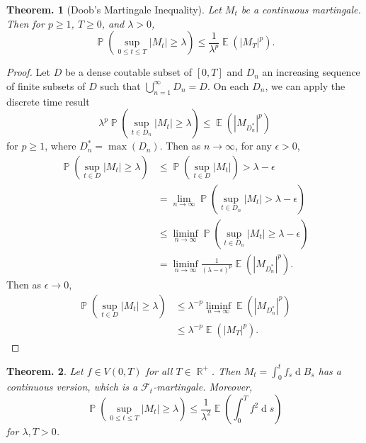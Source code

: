 \documentclass[11pt, a4paper]{memoir}
\DeclareMathOperator{\R}{{\mathbb{R}}}
\theoremstyle{change}
\newtheorem{theorem}{Theorem.}[section]
\theoremstyle{plain}
\theoremstyle{nonumberplain}
\newtheorem{proof}{Proof}
\DeclareMathOperator{\pr}{{\mathbb{P}}}
\DeclareMathOperator{\E}{{\mathbb{E}}}
\renewcommand{\d}[1]{\ensuremath{\operatorname{d}\!{#1}}}
\numberwithin{equation}{section}
\begin{document}
\begin{theorem}[Doob's Martingale Inequality]
    Let $M_t$ be a continuous martingale.
    Then for $p\geq 1$, $T\geq 0$, and $\lambda>0$,
    \begin{equation*}
        \pr(\sup_{0\leq t\leq T}|M_t|\geq\lambda)\leq\frac{1}{\lambda^p}\E(|M_T|^p).
    \end{equation*}
\end{theorem}
\begin{proof}
    Let $D$ be a dense coutable subset of $[0,T]$ and $D_n$ an increasing sequence of finite subsets of $D$ such that $\bigcup_{n=1}^\infty D_n=D$.
    On each $D_n$, we can apply the discrete time result
    \begin{equation*}
        \lambda^p\pr(\sup_{t\in D_n}|M_t|\geq\lambda)\leq\E(|M_{D_n^*}|^p)
    \end{equation*}
    for $p\geq 1$, where $D_n^*=\max(D_n)$.
    Then as $n\to\infty$, for any $\epsilon>0$,
    \begin{align*}
        \pr(\sup_{t\in D}|M_t|\geq\lambda)&\leq\pr(\sup_{t\in D}|M_t|)>\lambda-\epsilon\\
                                          &=\lim_{n\to\infty}\pr(\sup_{t\in D_n}|M_t|>\lambda-\epsilon)\\
                                          &\leq\liminf_{n\to\infty}\pr(\sup_{t\in D_n}|M_t|\geq\lambda-\epsilon)\\
                                          &= \liminf_{n\to\infty}\frac{1}{(\lambda-\epsilon)^p}\E(|M_{D_n^*}|^p).
    \end{align*}
    Then as $\epsilon\to 0$,
    \begin{align*}
        \pr(\sup_{t\in D}|M_t|\geq\lambda) &\leq\lambda^{-p}\liminf_{n\to\infty}\E(|M_{D_n^*}|^p)\\
                                           &\leq\lambda^{-p}\E(|M_T|^p).
    \end{align*}
\end{proof}
\begin{theorem}
    Let $f\in V(0,T)$ for all $T\in\R^+$.
    Then $M_t=\int_0^tf_s\d{B_s}$ has a continuous version, which is a $\mathcal{F}_t$-martingale.
    Moreover,
    \begin{equation*}
        \pr\left(\sup_{0\leq t\leq T}|M_t|\geq\lambda\right)\leq\frac{1}{\lambda^2}\E(\int_0^Tf^2\d{s})
    \end{equation*}
    for $\lambda,T>0$.
\end{theorem}
\end{document}

